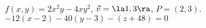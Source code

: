 {$f(x,y) = 2x^2y-4xy^2$,  $\vec v = \la 1,3\ra$, $P=(2,3)$.\label{12_06_ex_17}
}
{
$-12(x-2)-40(y-3) -(z+48) = 0$
}